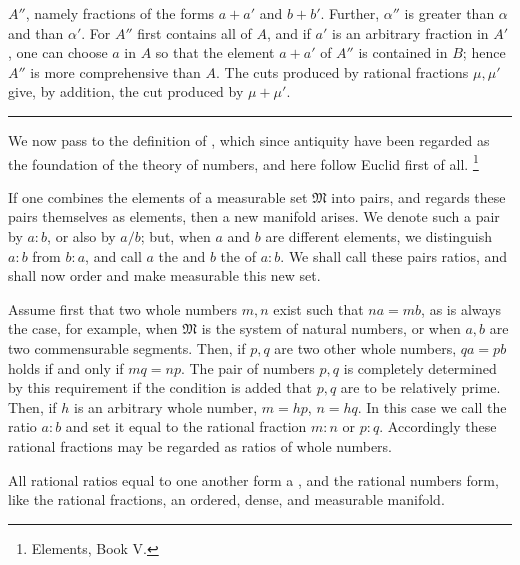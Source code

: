 $A''$, namely fractions of the forms $a+a'$ and $b+b'$. Further,
$\alpha''$ is greater than $\alpha$ and than $\alpha'$. For $A''$
first contains all of $A$, and if $a'$ is an arbitrary fraction in
$A'$, one can choose $a$ in $A$ so that the element $a+a'$ of $A''$ is
contained in $B$; hence $A''$ is more comprehensive than $A$. The cuts
produced by rational fractions $\mu,\mu'$ give, by addition, the cut
produced by $\mu+\mu'$.

\begin{center}
\rule{0.18\linewidth}{0.4pt}
\end{center}

We now pass to the definition of , which since
antiquity have been regarded as the foundation of the theory of
numbers, and here follow Euclid first of all.
\setcounter{footnote}{0}\footnote{Elements, Book V.}

If one combines the elements of a measurable set $\mathfrak M$ into
pairs, and regards these pairs themselves as elements, then a new
manifold arises. We denote such a pair by $a:b$, or also by $a/b$; but,
when $a$ and $b$ are different elements, we distinguish $a:b$ from
$b:a$, and call $a$ the  and $b$ the
 of $a:b$. We shall call these pairs ratios, and
shall now order and make measurable this new set.

Assume first that two whole numbers $m,n$ exist such that $na=mb$, as
is always the case, for example, when $\mathfrak M$ is the system of
natural numbers, or when $a,b$ are two commensurable segments. Then,
if $p,q$ are two other whole numbers, $qa=pb$ holds if and only if
$mq=np$. The pair of numbers $p,q$ is completely determined by this
requirement if the condition is added that $p,q$ are to be relatively
prime. Then, if $h$ is an arbitrary whole number, $m=hp$, $n=hq$. In
this case we call the ratio $a:b$  and set it equal
to the rational fraction $m:n$ or $p:q$. Accordingly these rational
fractions may be regarded as ratios of whole numbers.

All rational ratios equal to one another form a , and the rational numbers form, like the rational fractions,
an ordered, dense, and measurable manifold.
